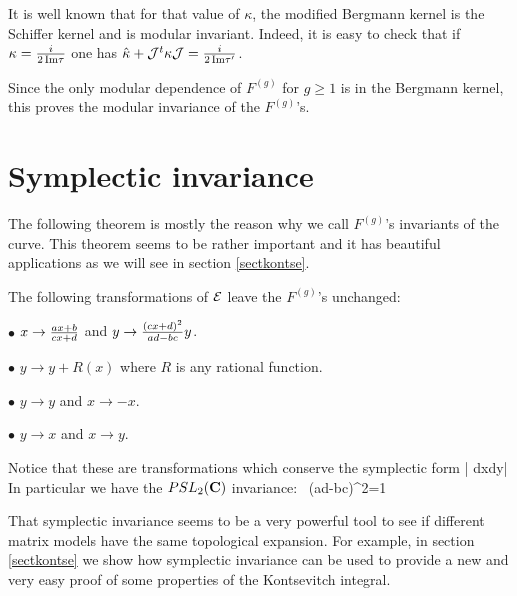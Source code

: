 {It is well known that for that value of $\kappa$, the modified Bergmann kernel is the Schiffer kernel and is modular invariant.
Indeed, it is easy to check that if $\kappa={i\over 2\,\Im\tau}$ one has
$\hat\kappa+{\cal J}^t \kappa {\cal J} = {i\over 2\,\Im\tau'}$.


Since the only modular dependence of $F^{(g)}$ for $g\geq 1$ is in the Bergmann kernel, this proves the modular invariance of the $F^{(g)}$'s.

}




\section{Symplectic invariance}

The following theorem is mostly the reason why we call $F^{(g)}$'s invariants of the curve.
This theorem seems to be rather important and it has beautiful applications as we will see in section \ref{sectkontse}.

\bt
\label{symplinv}
The following transformations of $\curve$ leave the $F^{(g)}$'s unchanged:

$\bullet$ \vspace{0.3mm} $x\to {ax+b\over cx+d}$ and $y\to {(cx+d)^2\over ad-bc} y$.

$\bullet$ \vspace{0.3mm} $y\to y +R(x)$ where $R$ is any rational function.

$\bullet$ \vspace{0.3mm} $y\to  y$ and $x\to -x$.

$\bullet$ \vspace{0.3mm} $y\to x$ and $x\to y$.


\et
Notice that these are transformations which conserve the symplectic  form
\beq|
dx\wedge dy|
\eeq
In particular we have the $PSL_2(\C)$ invariance:
\beq
{} \longrightarrow {}\, \qquad\virg (ad-bc)^2=1
\eeq

That symplectic invariance seems to be a very powerful tool to see if different matrix models have the same topological expansion. For example, in section \ref{sectkontse} we show how symplectic invariance can be used to provide a new and very easy proof of some properties of the Kontsevitch integral.


\medskip


